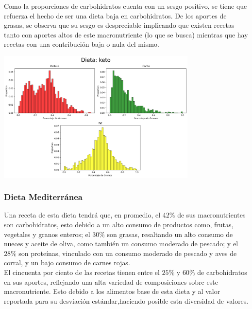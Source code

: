 \documentclass[12pt,a4paper]{article}
\begin{document}
            Como la proporciones de carbohidratos cuenta con un sesgo positivo, se 
            tiene que refuerza el hecho de ser una dieta baja en carbohidratos. 
            De los aportes de grasas, se observa que su sesgo es despreciable implicando 
            que existen recetas tanto con aportes altos de este macronutriente (lo que se 
            busca) mientras que hay recetas con una contribución baja o nula del mismo.
            
            \begin{center}
                \includegraphics[width=0.75\textwidth]{Resources/2_03_plot_02.png}
            \end{center}

        \subsubsection{Dieta Mediterránea}

            Una receta de esta dieta tendrá que, en promedio, el $42\%$ de sus 
            macronutrientes son carbohidratos, esto debido a un alto consumo de 
            productos como, frutas, vegetales y granos enteros; el $30\%$ son 
            grasas, resaltando un alto consumo de nueces y aceite de oliva, como 
            también un consumo moderado de pescado; y el $28\%$ son proteínas, 
            vinculado con un consumo moderado de pescado y aves de corral, y un 
            bajo consumo de carnes rojas.\\

            El cincuenta por ciento de las recetas tienen entre el $25\%$ y $60\%$ 
            de carbohidratos en sus aportes, reflejando una alta variedad de composiciones 
            sobre este macronutriente. Esto debido a los alimentos base de esta dieta y 
            al valor reportada para su desviación estándar,haciendo posible esta 
            diversidad de valores.\\
\end{document}
